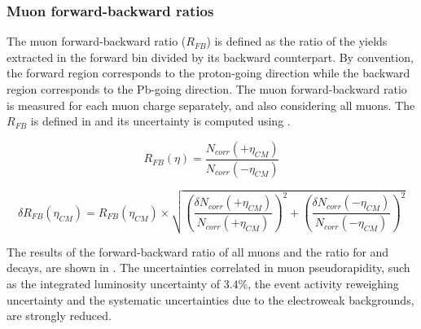 \subsubsection{Muon forward-backward ratios} \label{sec:WBoson_Results_Observables_ForwardBackwardRatio}

The muon forward-backward ratio ($R_{FB}$) is defined as the ratio of the \WToMuNu yields extracted in the forward \etaCM bin divided by its backward counterpart. By convention, the forward region corresponds to the proton-going direction while the backward region corresponds to the Pb-going direction. The muon forward-backward ratio is measured for each muon charge separately, and also considering all muons. The $R_{FB}$ is defined in  and its uncertainty is computed using .

\begin{equation}
R_{FB}(\eta) = \frac{ N_{corr}(+\eta_{CM}) }{ N_{corr}(-\eta_{CM}) }
\label{eq:MuonForwardBackwardAsymmetry}
\end{equation}

\begin{equation}
\delta{R_{FB}(\eta_{CM})} = R_{FB}(\eta_{CM}) \times \sqrt{
	\left(\frac{\delta{N_{corr}(+\eta_{CM})}}{N_{corr}(+\eta_{CM})}\right)^{2} +
	\left(\frac{\delta{N_{corr}(-\eta_{CM})}}{N_{corr}(-\eta_{CM})}\right)^{2}
}
\label{eq:MuonForwardBackwardAsymmetryStatError}
\end{equation}

The results of the forward-backward ratio of all muons and the ratio for \WToMuNuMi and \WToMuNuPl decays, are shown in . The uncertainties correlated in muon pseudorapidity, such as the integrated luminosity uncertainty of 3.4$\%$, the event activity reweighing uncertainty and the systematic uncertainties due to the electroweak backgrounds, are strongly reduced.

